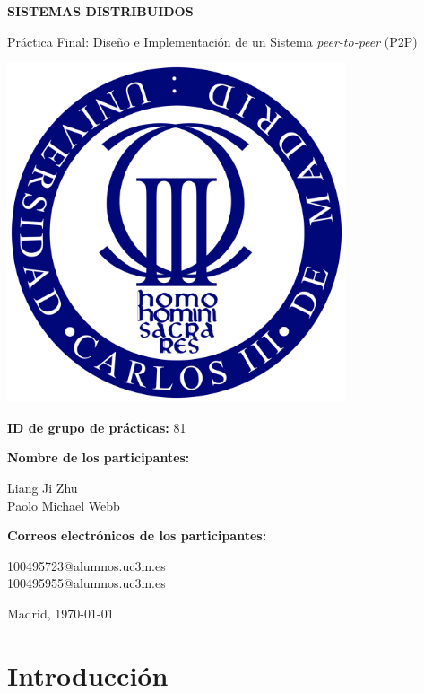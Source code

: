 \documentclass[12pt,a4paper]{article}
\begin{document}
\begin{titlepage}
    \centering
    {\LARGE\textbf{SISTEMAS DISTRIBUIDOS}\par}
    \vspace{1cm}
    {\Large {Práctica Final: Diseño e Implementación de un Sistema \textit{peer-to-peer} (P2P)}\par}
    \vspace{1cm}
    \vfill
    \includegraphics[width=0.75\textwidth]{logo_universidad.png}
    \vfill
    \vspace{1cm}
    {\large\textbf{ID de grupo de prácticas:} 81\par}
    {\large\textbf{Nombre de los participantes:}\par}
    {\normalsize Liang Ji Zhu \\ Paolo Michael Webb\par}
    {\large\textbf{Correos electrónicos de los participantes:}\par}
    {\normalsize 100495723@alumnos.uc3m.es \\ 100495955@alumnos.uc3m.es\par}
    \vfill
    {\large Madrid, \today\par}
\end{titlepage}

\clearpage
\tableofcontents
\clearpage

\section{Introducción}
\end{document}
